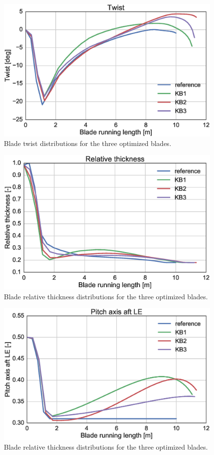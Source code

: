 \begin{figure}[!ht]
\begin{center}
	\includegraphics[width=.85\linewidth]{figures/KB_twist.eps}
\end{center}
\caption{Blade twist distributions for the three optimized blades.}
\label{fig:twist}
\end{figure}

\begin{figure}[!ht]
\begin{center}
	\includegraphics[width=.85\linewidth]{figures/KB_rthick.eps}
\end{center}
\caption{Blade relative thickness distributions for the three optimized blades.}
\label{fig:rthick}
\end{figure}


\begin{figure}[!ht]
\begin{center}
	\includegraphics[width=.85\linewidth]{figures/KB_p_le.eps}
\end{center}
\caption{Blade relative thickness distributions for the three optimized blades.}
\label{fig:p_le}
\end{figure}

